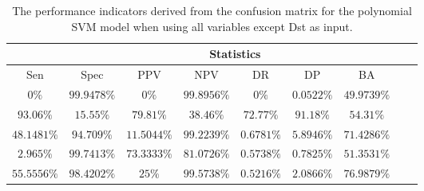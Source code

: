 \begin{table}[!ht]
	\centering
	\begin{tabular}{|c|c|c|c|c|c|c|c|c|}
		\hline
		 & \multicolumn{7}{c|}{Statistics} \\ \hline
		Sen & Spec & PPV & NPV & DR & DP & BA \\ \hline
		$0\%$ & $99.9478\%$ & $0\%$ & $99.8956\%$ & $0\%$ & $0.0522\%$ & $49.9739\%$ \\ \hline
		$93.06\%$ & $15.55\%$ & $79.81\%$ & $38.46\%$ & $72.77\%$ & $91.18\%$ & $54.31\%$ \\ \hline
		$48.1481\%$ & $94.709\%$ & $11.5044\%$ & $99.2239\%$ & $0.6781\%$ & $5.8946\%$ & $71.4286\%$ \\ \hline
		$2.965\%$ & $99.7413\%$ & $73.3333\%$ & $81.0726\%$ & $0.5738\%$ & $0.7825\%$ & $51.3531\%$ \\ \hline
		$55.5556\%$ & $98.4202\%$ & $25\%$ & $99.5738\%$ & $0.5216\%$ & $2.0866\%$ & $76.9879\%$ \\ \hline
	\end{tabular}
	\caption{The performance indicators derived from the confusion matrix for the polynomial SVM model when using all variables except Dst as input.}
	\label{tab:cs:noDst:svmPoly}
\end{table}
